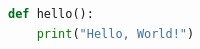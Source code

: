 \documentclass{article}
\begin{document}
\begin{lstlisting}[language=Python, caption={Your caption}]
def hello():
    print("Hello, World!")
\end{lstlisting}
\end{document}
